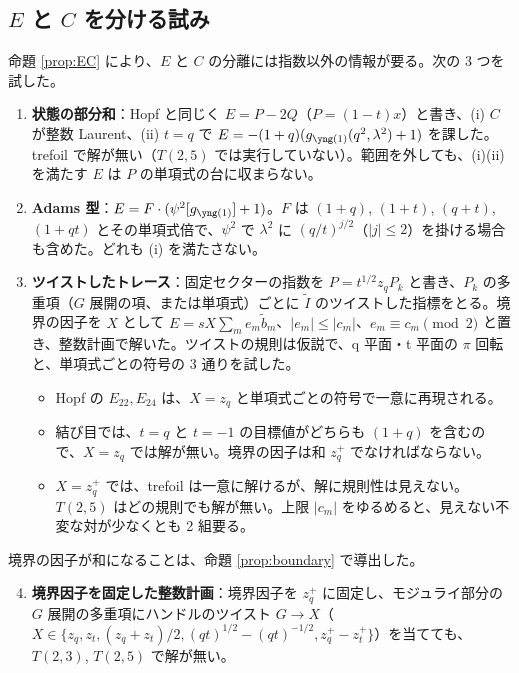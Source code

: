 \subsection{$E$ と $C$ を分ける試み}\label{sec:EC}
命題 \ref{prop:EC} により、$E$ と $C$ の分離には指数以外の情報が要る。次の 3 つを試した。
\begin{compresult}\label{cr:EC}
\begin{enumerate}
\item \textbf{状態の部分和}：Hopf と同じく $E = P - 2Q$（$P = (1-t)x$）と書き、(i) $C$ が整数 Laurent、(ii) $t = q$ で $E = -(1+q)(g_{\yone}(q^2, \lambda^2) + 1)$ を課した。trefoil で解が無い（$T(2,5)$ では実行していない）。範囲を外しても、(i)(ii) を満たす $E$ は $P$ の単項式の台に収まらない。
\item \textbf{Adams 型}：$E = F\cdot(\psi^2[g_{\yone}] + 1)$。$F$ は $(1+q)$, $(1+t)$, $(q+t)$, $(1+qt)$ とその単項式倍で、$\psi^2$ で $\lambda^2$ に $(q/t)^{j/2}$（$|j| \le 2$）を掛ける場合も含めた。どれも (i) を満たさない。
\item \textbf{ツイストしたトレース}：固定セクターの指数を $P = t^{1/2} z_q P_k$ と書き、$P_k$ の多重項（$G$ 展開の項、または単項式）ごとに $\tilde I$ のツイストした指標をとる。境界の因子を $X$ として $E = sX\sum_m e_m\tilde b_m$、$|e_m| \le |c_m|$、$e_m \equiv c_m \pmod 2$ と置き、整数計画で解いた。ツイストの規則は仮説で、q 平面・t 平面の $\pi$ 回転と、単項式ごとの符号の 3 通りを試した。
  \begin{itemize}
  \item Hopf の $E_{22}, E_{24}$ は、$X = z_q$ と単項式ごとの符号で一意に再現される。
  \item 結び目では、$t = q$ と $t = -1$ の目標値がどちらも $(1 + q)$ を含むので、$X = z_q$ では解が無い。境界の因子は和 $z_q^+$ でなければならない。
  \item $X = z_q^+$ では、trefoil は一意に解けるが、解に規則性は見えない。$T(2,5)$ はどの規則でも解が無い。上限 $|c_m|$ をゆるめると、見えない不変な対が少なくとも 2 組要る。
  \end{itemize}
\end{enumerate}
境界の因子が和になることは、命題 \ref{prop:boundary} で導出した。
\begin{enumerate}
\setcounter{enumi}{3}
\item \textbf{境界因子を固定した整数計画}：境界因子を $z_q^+$ に固定し、モジュライ部分の $G$ 展開の多重項にハンドルのツイスト $G\to X$（$X\in\{z_q, z_t, (z_q+z_t)/2, (qt)^{1/2}-(qt)^{-1/2}, z_q^+-z_t^+\}$）を当てても、$T(2,3)$, $T(2,5)$ で解が無い。

\end{enumerate}
\end{compresult}
